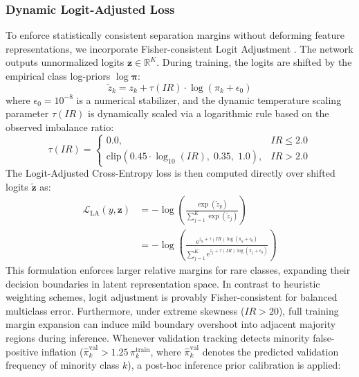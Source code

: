 \documentclass{ieeeaccess}
\begin{document}
\subsubsection{Dynamic Logit-Adjusted Loss}
To enforce statistically consistent separation margins without deforming feature representations, we incorporate Fisher-consistent Logit Adjustment \cite{menon2021longtail}. The network outputs unnormalized logits $\mathbf{z} \in \mathbb{R}^K$. During training, the logits are shifted by the empirical class log-priors $\log \boldsymbol{\pi}$:
\begin{equation}
\label{eq:logit_adjustment}
    \tilde{z}_k = z_k + \tau(IR) \cdot \log(\pi_k + \epsilon_0)
\end{equation}
where $\epsilon_0 = 10^{-8}$ is a numerical stabilizer, and the dynamic temperature scaling parameter $\tau(IR)$ is dynamically scaled via a logarithmic rule based on the observed imbalance ratio:
\begin{equation}
\label{eq:tau_formula}
    \tau(IR) = \begin{cases}
        0.0, & IR \le 2.0 \\
        \text{clip}\left(0.45 \cdot \log_{10}(IR), \; 0.35, \; 1.0\right), & IR > 2.0
    \end{cases}
\end{equation}
The Logit-Adjusted Cross-Entropy loss is then computed directly over shifted logits $\tilde{\mathbf{z}}$ as:
\begin{equation}
\label{eq:la_loss}
\begin{aligned}
    \mathcal{L}_{\text{LA}}(y, \mathbf{z}) &= -\log \left( \frac{\exp(\tilde{z}_y)}{\sum_{j=1}^K \exp(\tilde{z}_j)} \right) \\
    &= -\log \left( \frac{\mathrm{e}^{z_y + \tau(IR) \log (\pi_y + \epsilon_0)}}{\sum_{j=1}^K \mathrm{e}^{z_j + \tau(IR) \log (\pi_j + \epsilon_0)}} \right)
\end{aligned}
\end{equation}
This formulation enforces larger relative margins for rare classes, expanding their decision boundaries in latent representation space. In contrast to heuristic weighting schemes, logit adjustment is provably Fisher-consistent for balanced multiclass error. Furthermore, under extreme skewness ($IR > 20$), full training margin expansion can induce mild boundary overshoot into adjacent majority regions during inference. Whenever validation tracking detects minority false-positive inflation ($\hat{\pi}_k^{\text{val}} > 1.25\,\pi_k^{\text{train}}$, where $\hat{\pi}_k^{\text{val}}$ denotes the predicted validation frequency of minority class $k$), a post-hoc inference prior calibration is applied:
\end{document}
